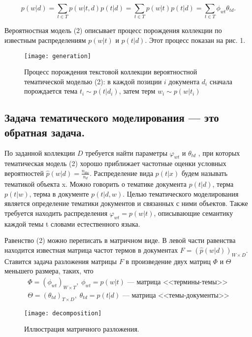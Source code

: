 \documentclass[12pt,twoside]{article}
\begin{document}
	\begin{equation}\label{eq_0}
	p(w|d) = \sum\limits_{t \in T} p(w|t, d) p(t|d) = \sum\limits_{t \in T} p(w|t) p(t|d) = \sum\limits_{t \in T}\phi_{wt}\theta_{td}.
	\end{equation}
	
	Вероятностная модель (2) описывает процесс порождения коллекции по известным распределениям $p(w|t)$ и $p(t|d)$. Этот процесс показан на рис. 1.
	
	\begin{figure}[h]
		\texttt{[image: generation]}
		\caption{Процесс порождения текстовой коллекции вероятностной тематической моделью (2): в каждой позиции $i$ документа $d_i$ сначала порождается тема $t_i \sim p(t|d_i)$, затем терм $w_i \sim p(w|t_i)$}
		\label{fg:generation}
	\end{figure}
	
	\subsection{Задача тематического моделирования --- это обратная задача.} По заданной коллекции $D$ требуется найти параметры $\varphi_{wt}$ и $\theta_{td}$ , при которых тематическая модель (2)
	хорошо приближает частотные оценки условных вероятностей \newline $\hat{p}(w|d)=\frac{n_{dw}}{n_d}$. Распределение вида $p(t|x)$ будем называть тематикой объекта x. Можно говорить о тематике документа $p(t|d)$, терма $p(t|w)$, терма в документе $p(t|d, w)$.
	Целью тематического моделирования является определение тематики документов
	и связанных с ними объектов. Также требуется находить распределения $\varphi_{wt}= p(w|t)$,
	описывающие семантику каждой темы t словами естественного языка.
	
	Равенство (2) можно переписать в матричном виде. В левой части равенства находится известная матрица частот термов в документах $F=(\hat{p}(w|d))_{W \times D}$. Ставится задача разложения матрицы $F$ в произведение двух матриц $\Phi$ и $\Theta$ меньшего размера, таких, что
	\begin{gather*}
	\Phi = (\phi_{wt})_{W \times T}, \; \phi_{wt} = p(w|t)      \text{ --- матрица <<термины-темы>>}\\
	\Theta = (\theta_{td})_{T \times D}, \; \theta_{td} = p(t|d)  \text{ --- матрица <<темы-документы>>}
	\end{gather*}
	
	\begin{figure}[h]
		\texttt{[image: decomposition]}
		\caption{Иллюстрация матричного разложения.}
		\label{fg:Example}
	\end{figure}
	
\end{document}

